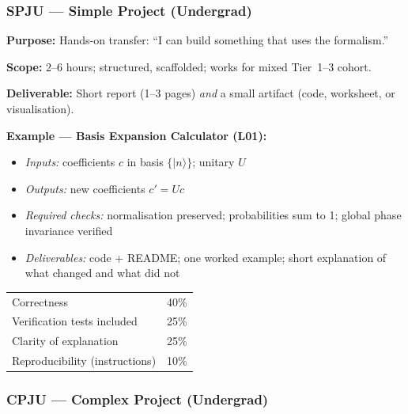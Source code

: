 \documentclass[11pt,a4paper]{article}
\begin{document}
\bigskip
\subsubsection{SPJU --- Simple Project (Undergrad)}

\begin{tcolorbox}[ugprobbox, title={SPJU --- Simple Project, Undergraduate \hfill\normalfont 1 project}]

\textbf{Purpose:} Hands-on transfer: ``I can build something that uses the formalism.''

\medskip\textbf{Scope:} 2--6 hours; structured, scaffolded; works for mixed Tier~1--3 cohort.

\medskip\textbf{Deliverable:} Short report (1--3 pages) \emph{and} a small artifact
(code, worksheet, or visualisation).

\medskip\textbf{Example --- Basis Expansion Calculator (L01):}
\begin{itemize}[leftmargin=1.5em,itemsep=2pt]
  \item \textit{Inputs:} coefficients $c$ in basis $\{|n\rangle\}$; unitary $U$
  \item \textit{Outputs:} new coefficients $c'=Uc$
  \item \textit{Required checks:} normalisation preserved; probabilities sum to 1;
        global phase invariance verified
  \item \textit{Deliverables:} code + README; one worked example; short explanation
        of what changed and what did not
\end{itemize}
\end{tcolorbox}

\begin{tcolorbox}[rubricbox, title={SPJU Rubric}]
\begin{tabular}{ll}
  Correctness                    & 40\%\\
  Verification tests included    & 25\%\\
  Clarity of explanation         & 25\%\\
  Reproducibility (instructions) & 10\%\\
\end{tabular}
\end{tcolorbox}

\bigskip
\subsubsection{CPJU --- Complex Project (Undergrad)}
\end{document}
